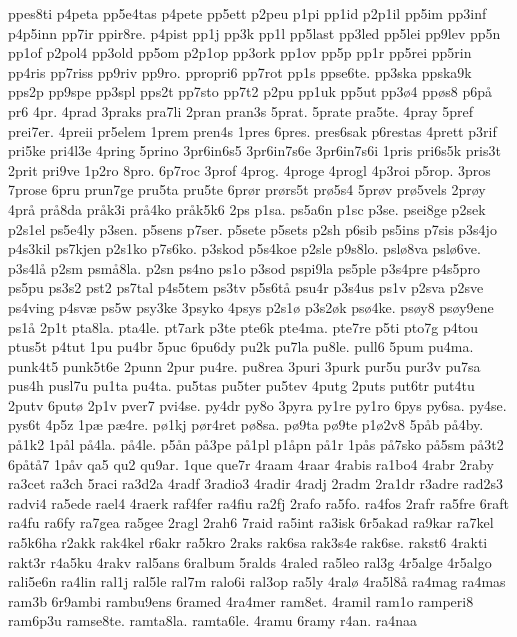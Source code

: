 ppes8ti
p4peta
pp5e4tas
p4pete
pp5ett
p2peu
p1pi
pp1id
p2p1il
pp5im
pp3inf
p4p5inn
pp7ir
ppir8re.
p4pist
pp1j
pp3k
pp1l
pp5last
pp3led
pp5lei
pp9lev
pp5n
pp1of
p2pol4
pp3old
pp5om
p2p1op
pp3ork
pp1ov
pp5p
pp1r
pp5rei
pp5rin
pp4ris
pp7riss
pp9riv
pp9ro.
ppropri6
pp7rot
pp1s
ppse6te.
pp3ska
ppska9k
pps2p
pp9spe
pp3spl
pps2t
pp7sto
pp7t2
p2pu
pp1uk
pp5ut
pp3^^f84
pp^^f8s8
p6p^^e5
pr6
4pr.
4prad
3praks
pra7li
2pran
pran3s
5prat.
5prate
pra5te.
4pray
5pref
prei7er.
4preii
pr5elem
1prem
pren4s
1pres
6pres.
pres6sak
p6restas
4prett
p3rif
pri5ke
pri4l3e
4pring
5prino
3pr6in6s5
3pr6in7s6e
3pr6in7s6i
1pris
pri6s5k
pris3t
2prit
pri9ve
1p2ro
8pro.
6p7roc
3prof
4prog.
4proge
4progl
4p3roi
p5rop.
3pros
7prose
6pru
prun7ge
pru5ta
pru5te
6pr^^f8r
pr^^f8rs5t
pr^^f85s4
5pr^^f8v
pr^^f85vels
2pr^^f8y
4pr^^e5
pr^^e58da
pr^^e5k3i
pr^^e54ko
pr^^e5k5k6
2ps
p1sa.
ps5a6n
p1sc
p3se.
psei8ge
p2sek
p2s1el
ps5e4ly
p3sen.
p5sens
p7ser.
p5sete
p5sets
p2sh
p6sib
ps5ins
p7sis
p3s4jo
p4s3kil
ps7kjen
p2s1ko
p7s6ko.
p3skod
p5s4koe
p2sle
p9s8lo.
psl^^f88va
psl^^f86ve.
p3s4l^^e5
p2sm
psm^^e58la.
p2sn
ps4no
ps1o
p3sod
pspi9la
ps5ple
p3s4pre
p4s5pro
ps5pu
ps3s2
pst2
ps7tal
p4s5tem
ps3tv
p5s6t^^e5
psu4r
p3s4us
ps1v
p2sva
p2sve
ps4ving
p4sv^^e6
ps5w
psy3ke
3psyko
4psys
p2s1^^f8
p3s2^^f8k
ps^^f84ke.
ps^^f8y8
ps^^f8y9ene
ps1^^e5
2p1t
pta8la.
pta4le.
pt7ark
p3te
pte6k
pte4ma.
pte7re
p5ti
pto7g
p4tou
ptus5t
p4tut
1pu
pu4br
5puc
6pu6dy
pu2k
pu7la
pu8le.
pull6
5pum
pu4ma.
punk4t5
punk5t6e
2punn
2pur
pu4re.
pu8rea
3puri
3purk
pur5u
pur3v
pu7sa
pus4h
pusl7u
pu1ta
pu4ta.
pu5tas
pu5ter
pu5tev
4putg
2puts
put6tr
put4tu
2putv
6put^^f8
2p1v
pver7
pvi4se.
py4dr
py8o
3pyra
py1re
py1ro
6pys
py6sa.
py4se.
pys6t
4p5z
1p^^e6
p^^e64re.
p^^f81kj
p^^f8r4ret
p^^f88sa.
p^^f89ta
p^^f89te
p1^^f82v8
5p^^e5b
p^^e54by.
p^^e51k2
1p^^e5l
p^^e54la.
p^^e54le.
p5^^e5n
p^^e53pe
p^^e51pl
p1^^e5pn
p^^e51r
1p^^e5s
p^^e57sko
p^^e55sm
p^^e53t2
6p^^e5t^^e57
1p^^e5v
qa5
qu2
qu9ar.
1que
que7r
4raam
4raar
4rabis
ra1bo4
4rabr
2raby
ra3cet
ra3ch
5raci
ra3d2a
4radf
3radio3
4radir
4radj
2radm
2ra1dr
r3adre
rad2s3
radvi4
ra5ede
rael4
4raerk
raf4fer
ra4fiu
ra2fj
2rafo
ra5fo.
ra4fos
2rafr
ra5fre
6raft
ra4fu
ra6fy
ra7gea
ra5gee
2ragl
2rah6
7raid
ra5int
ra3isk
6r5akad
ra9kar
ra7kel
ra5k6ha
r2akk
rak4kel
r6akr
ra5kro
2raks
rak6sa
rak3s4e
rak6se.
rakst6
4rakti
rakt3r
r4a5ku
4rakv
ral5ans
6ralbum
5ralds
4raled
ra5leo
ral3g
4r5alge
4r5algo
rali5e6n
ra4lin
ral1j
ral5le
ral7m
ralo6i
ral3op
ra5ly
4ral^^f8
4ra5l8^^e5
ra4mag
ra4mas
ram3b
6r9ambi
rambu9ens
6ramed
4ra4mer
ram8et.
4ramil
ram1o
ramperi8
ram6p3u
ramse8te.
ramta8la.
ramta6le.
4ramu
6ramy
r4an.
ra4naa
